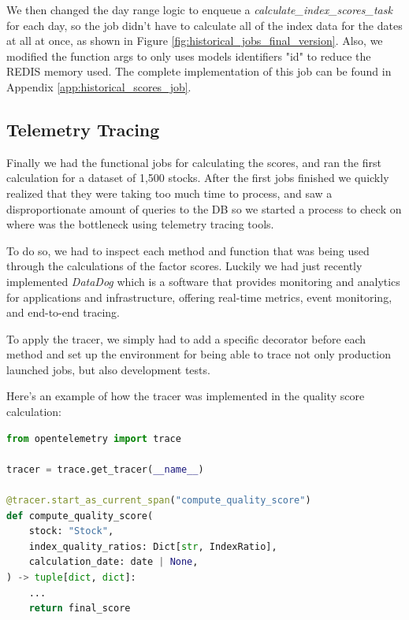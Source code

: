 \documentclass[11pt,english,a4paper,hidelinks]{book}
\begin{document}
\noindent We then changed the day range logic to enqueue a \textit{calculate\_index\_scores\_task} for each day, so the job didn't have to calculate all of the index data for the dates at all at once, as shown in Figure \ref{fig:historical_jobs_final_version}. Also, we modified the function args to only uses models identifiers "id" to reduce the REDIS memory used. The complete implementation of this job can be found in Appendix \ref{app:historical_scores_job}.

\subsection{Telemetry Tracing}
Finally we had the functional jobs for calculating the scores, and ran the first calculation for a dataset of 1,500 stocks. After the first jobs finished we quickly realized that they were taking too much time to process, and saw a disproportionate amount of queries to the DB so we started a process to check on where was the bottleneck using telemetry tracing tools.

\vspace{0.5cm}
\noindent To do so, we had to inspect each method and function that was being used through the calculations of the factor scores. Luckily we had just recently implemented \textit{DataDog} which is a software that provides monitoring and analytics for applications and infrastructure, offering real-time metrics, event monitoring, and end-to-end tracing.

\vspace{0.5cm}
\noindent To apply the tracer, we simply had to add a specific decorator before each method and set up the environment for being able to trace not only production launched jobs, but also development tests.

\vspace{0.5cm}
\noindent Here's an example of how the tracer was implemented in the quality score calculation:

\begin{lstlisting}[language=Python, caption=Telemetry Tracing Implementation, label={lst:telemetry_tracing_implementation}]
from opentelemetry import trace

tracer = trace.get_tracer(__name__)

@tracer.start_as_current_span("compute_quality_score")
def compute_quality_score(
    stock: "Stock",
    index_quality_ratios: Dict[str, IndexRatio],
    calculation_date: date | None,
) -> tuple[dict, dict]:
    ...
    return final_score
\end{lstlisting}
\end{document}
